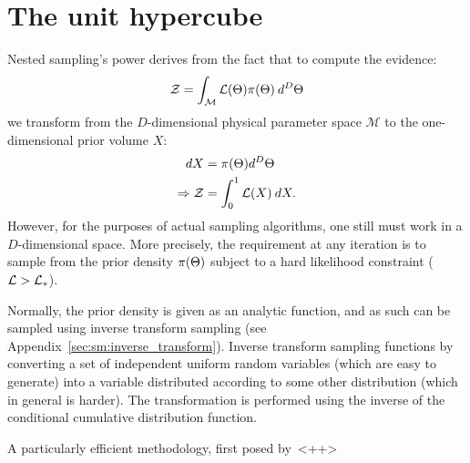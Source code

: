 \chapter{The unit hypercube}
\label{chap:hc}


Nested sampling's power derives from the fact that to compute the evidence:
\begin{equation}
  \mathcal{Z} = \int_\mathcal{M} \mathcal{L}(\Theta) \pi(\Theta)\: d^D\Theta
  \label{eqn:hc:evidence}
\end{equation}
we transform from the $D$-dimensional physical parameter space $\mathcal{M}$ to the one-dimensional prior volume $X$:
\begin{align}
  dX &= \pi(\Theta)d^D\Theta
  \label{eqn:hc:prior_vol_def} \\
  \Rightarrow \mathcal{Z} &= \int_0^1 \mathcal{L}(X) \: dX.
\end{align}
However, for the purposes of actual sampling algorithms, one still must work in a $D$-dimensional space. More precisely, the requirement at any iteration is to sample from the prior density $\pi(\Theta)$ subject to a hard likelihood constraint ($\mathcal{L}>\mathcal{L}_\ast$). 

Normally, the prior density is given as an analytic function, and as such can be sampled using inverse transform sampling (see Appendix~\ref{sec:sm:inverse_transform}). Inverse transform sampling functions by converting a set of independent uniform random variables (which are easy to generate) into a variable distributed according to some other distribution (which in general is harder). The transformation is performed using the inverse of the conditional cumulative distribution function. 

A particularly efficient methodology, first posed by~\cite{}<++>
